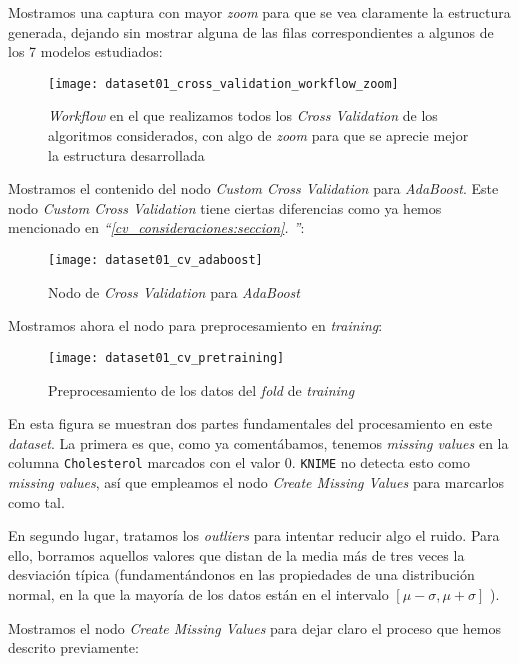 \documentclass[11pt]{article}
\newcommand{\customcite}[1]{\emph{``\ref{#1}. \nameref{#1}''}}
\begin{document}
Mostramos una captura con mayor \emph{zoom} para que se vea claramente la estructura generada, dejando sin mostrar alguna de las filas correspondientes a algunos de los 7 modelos estudiados:

\begin{figure}[H]
    \centering
    \texttt{[image: dataset01\_cross\_validation\_workflow\_zoom]}
    \caption{\emph{Workflow} en el que realizamos todos los \emph{Cross Validation} de los algoritmos considerados, con algo de \emph{zoom} para que se aprecie mejor la estructura desarrollada}
    \label{cross_val_zoom:image}
\end{figure}

Mostramos el contenido del nodo \emph{Custom Cross Validation} para \emph{AdaBoost}. Este nodo \emph{Custom Cross Validation} tiene ciertas diferencias como ya hemos mencionado en \customcite{cv_consideraciones:seccion}:

\begin{figure}[H]
    \centering
    \texttt{[image: dataset01\_cv\_adaboost]}
    \caption{Nodo de \emph{Cross Validation} para \emph{AdaBoost}}
\end{figure}

Mostramos ahora el nodo para preprocesamiento en \emph{training}:

\begin{figure}[H]
    \centering
    \texttt{[image: dataset01\_cv\_pretraining]}
    \caption{Preprocesamiento de los datos del \emph{fold} de \emph{training}}
\end{figure}

En esta figura se muestran dos partes fundamentales del procesamiento en este \emph{dataset}. La primera es que, como ya comentábamos, tenemos \emph{missing values} en la columna \lstinline{Cholesterol} marcados con el valor 0. \lstinline{KNIME} no detecta esto como \emph{missing values}, así que empleamos el nodo \emph{Create Missing Values} para marcarlos como tal.

En segundo lugar, tratamos los \emph{outliers} para intentar reducir algo el ruido. Para ello, borramos aquellos valores que distan de la media más de tres veces la desviación típica (fundamentándonos en las propiedades de una distribución normal, en la que la mayoría de los datos están en el intervalo $[\mu - \sigma, \mu + \sigma]$ \cite{intervalos_normal:online}).

Mostramos el nodo \emph{Create Missing Values} para dejar claro el proceso que hemos descrito previamente:
\end{document}

